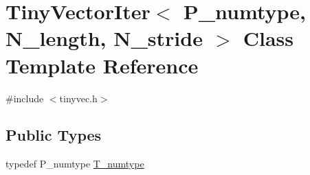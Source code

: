 \hypertarget{classTinyVectorIter}{}\section{Tiny\+Vector\+Iter$<$ P\+\_\+numtype, N\+\_\+length, N\+\_\+stride $>$ Class Template Reference}
\label{classTinyVectorIter}


{\ttfamily \#include $<$tinyvec.\+h$>$}

\subsection*{Public Types}
\begin{DoxyCompactItemize}
\item 
typedef P\+\_\+numtype \hyperlink{classTinyVectorIter_ab04e0c7e17b2742a45a7d52e8d5c6642}{T\+\_\+numtype}
\end{DoxyCompactItemize}

